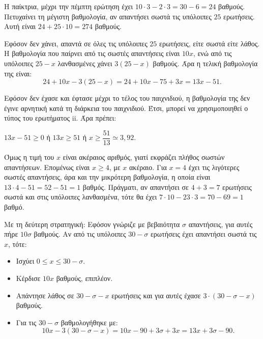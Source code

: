 
\begin{alist}
\item
\begin{rlist}
\item Η παίκτρια, μέχρι την πέμπτη ερώτηση έχει $10 \cdot 3 - 2 \cdot 3 = 30 - 6 = 24$ βαθμούς.
Πετυχαίνει τη μέγιστη βαθμολογία, αν απαντήσει σωστά τις υπόλοιπες $25$ ερωτήσεις.
Αυτή είναι $24 + 25 \cdot 10 = 274$ βαθμούς.
\item Εφόσον δεν χάνει, απαντά σε όλες τις υπόλοιπες $25$ ερωτήσεις, είτε σωστά είτε
λάθος.
Η βαθμολογία που παίρνει από τις σωστές απαντήσεις είναι $10x$, ενώ από τις υπόλοιπες
$25 - x$ λανθασμένες χάνει $3(25 - x)$ βαθμούς.
Άρα η τελική βαθμολογία της είναι:
\[24 + 10x - 3(25 - x) = 24 + 10x - 75 + 3x = 13x - 51.\]
\item Εφόσον δεν έχασε και έφτασε μέχρι το τέλος του παιχνιδιού, η βαθμολογία της δεν
έγινε αρνητική κατά τη διάρκεια του παιχνιδιού.
Έτσι, μπορεί να χρησιμοποιηθεί ο τύπος του ερωτήματος ii. Άρα πρέπει:

$13x - 51 \ge 0$ ή $13x \ge 51$ ή $x \ge \dfrac{51}{13} \simeq 3,92$.

Όμως η τιμή του $x$ είναι ακέραιος αριθμός, γιατί εκφράζει πλήθος σωστών απαντήσεων.
Επομένως είναι $x \ge 4$, με $x$ ακέραιο.
Για $x = 4$ έχει τις λιγότερες σωστές απαντήσεις, άρα και την μικρότερη βαθμολογία, η
οποία είναι $13 \cdot 4 - 51 = 52 - 51 = 1$ βαθμός.
Πράγματι, αν απαντήσει σε $4 + 3 = 7$ ερωτήσεις σωστά και στις υπόλοιπες
λανθασμένα, τότε θα έχει $7 \cdot 10 - 23 \cdot 3 = 70 - 69 = 1$ βαθμό.
\end{rlist}

\item
\begin{rlist}
\item Με τη δεύτερη στρατηγική:
Εφόσον γνώριζε με βεβαιότητα $\sigma$ απαντήσεις, για αυτές πήρε $10\sigma$ βαθμούς.
Αν από τις υπόλοιπες $30 - \sigma$ ερωτήσεις έχει απαντήσει σωστά τις $x$, τότε:
\begin{itemize}
\item Ισχύει $0 \le x \le 30 - \sigma$.
\item Κέρδισε $10x$ βαθμούς, επιπλέον.
\item Απάντησε λάθος σε $30 - \sigma - x$ ερωτήσεις και για αυτές έχασε $3 \cdot (30 - \sigma - x)$
βαθμούς.
\item Για τις $30 - \sigma$ βαθμολογήθηκε με:
\[10x - 3(30 - \sigma - x) = 10x - 90 + 3\sigma + 3x = 13x + 3\sigma - 90.\]
\end{itemize}


\end{rlist}
\end{alist}
